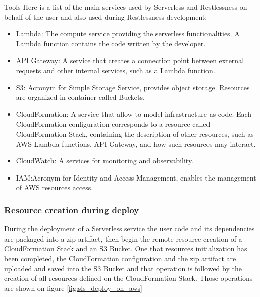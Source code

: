 \begin{chapter}{Tools}
    Here is a list of the main services used by Serverless and Restlessness on
    behalf of the user and also used during Restlessness development:
    \begin{itemize}
        \item Lambda: The compute service providing the serverless functionalities.
            A Lambda function contains the code written by the developer.
        \item API Gateway: A service that creates a connection point between
            external requests and other internal services, such as a Lambda function.
        \item S3: Acronym for Simple Storage Service, provides object storage.
            Resources are organized in container called Buckets.
        \item CloudFormation: A service that allow to model infrastructure as code.
            Each CloudFormation configuration corresponds to a resource called
            CloudFormation Stack, containing the description of other resources,
            such as AWS Lambda functions, API Gateway, and how such resources may
            interact.
        \item CloudWatch: A services for monitoring and observability.
        \item IAM:Acronym for Identity and Access Management, enables the management
            of AWS resources access.
    \end{itemize}

    \subsubsection{Resource creation during deploy}
    During the deployment of a Serverless service the user code and its dependencies
    are packaged into a zip artifact, then begin the remote resource creation of
    a CloudFormation Stack and an S3 Bucket. One that resources initialization has
    been completed, the CloudFormation configuration and the zip artifact are uploaded
    and saved into the S3 Bucket and that operation is followed by the creation of
    all resources defined on the CloudFormation Stack. Those operations are shown
    on figure \ref{fig:sls_deploy_on_aws}


\end{chapter}
